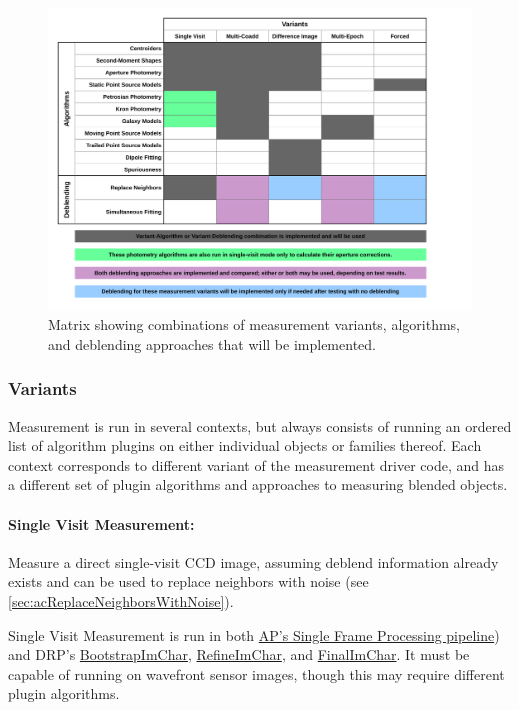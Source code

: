 \begin{figure}
\centering
\includegraphics[width=\textwidth]{figures/measurement-matrix.pdf}
\caption{Matrix showing combinations of measurement variants, algorithms, and deblending approaches that will be implemented.
\label{fig:measurement-matrix}}
\end{figure}

\subsubsection{Variants}
Measurement is run in several contexts, but always consists of running an ordered list of algorithm plugins on either individual objects or families thereof.  Each context corresponds to different variant of the measurement driver code, and has a different set of plugin algorithms and approaches to measuring blended objects.

\paragraph{Single Visit Measurement:} Measure a direct single-visit CCD image, assuming deblend information already exists and can be used to replace neighbors with noise (see \ref{sec:acReplaceNeighborsWithNoise}).
\label{sec:acSingleVisitMeasurement}

Single Visit Measurement is run in both \hyperref[sec:apSingleFrameProcessing]{AP's Single Frame Processing pipeline}) and DRP's \hyperref[sec:drpBootstrapImChar]{BootstrapImChar}, \hyperref[sec:drpRefineImChar]{RefineImChar}, and \hyperref[sec:drpFinalImChar]{FinalImChar}.  It must be capable of running on wavefront sensor images, though this may require different plugin algorithms.

